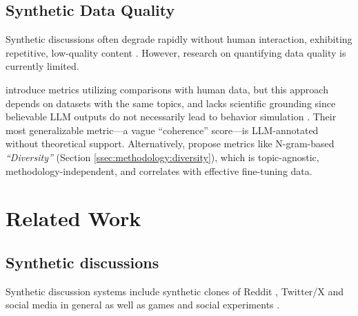 \subsection{Synthetic Data Quality}
\label{ssec:related:quality}

Synthetic discussions often degrade rapidly without human interaction, exhibiting repetitive, low-quality content \citep{ulmer2024}. 
However, research on quantifying data quality is currently limited.

\citet{balog_2024} introduce metrics utilizing comparisons with human data, but this approach depends on datasets with the same topics, and lacks scientific grounding since believable \ac{LLM} outputs do not necessarily lead to behavior simulation \cite{rossi_2024}. Their most generalizable metric—a vague “coherence” score—is \ac{LLM}-annotated without theoretical support. Alternatively, \citet{ulmer2024} propose metrics like N-gram-based \textit{“Diversity”} (Section \ref{ssec:methodology:diversity}), which is topic-agnostic, methodology-independent, and correlates with effective fine-tuning data.


\section{Related Work}

\subsection{Synthetic discussions}
\label{ssec:related:discussions}


Synthetic discussion systems 
include synthetic clones of Reddit \cite{park_simulacra}, Twitter/X \cite{mou_2024} and social media in general \cite{tornberg_2023, y_social} as well as games \cite{Park2023GenerativeAI} and social experiments \cite{zhou_2024_sotopia}.

